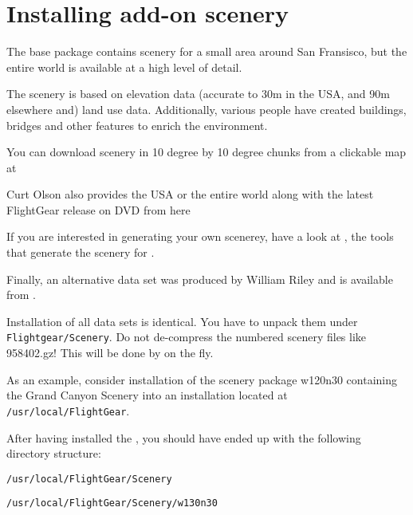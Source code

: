 \section{Installing add-on scenery}

The \FlightGear{} base package contains scenery for a small area around San Fransisco, but the entire world is available at a high level of detail.

The scenery is based on  elevation data (accurate to 30m in the USA, and 90m elsewhere and)  land use data. Additionally, various people have created buildings, bridges and other features to enrich the environment.

You can download scenery in 10 degree by 10 degree chunks from a clickable map at

\medskip
{}
\medskip

Curt Olson also provides the USA or the entire world along with the latest FlightGear release on DVD from here
\medskip
{}
\medskip

If you are interested in generating your own scenerey, have a look at , the tools that generate the scenery for \FlightGear{}.

Finally, an alternative data set was produced by William Riley and is available from
.

Installation of all data sets is identical. You have to unpack them
under \texttt{Flightgear/Scenery}. Do not de-compress the numbered
scenery files like 958402.gz! This will be done by \FlightGear{} on the
fly.

As an example, consider installation of the scenery package w120n30 containing the Grand
Canyon Scenery into an installation located at \texttt{/usr/local/FlightGear}.

After having installed the , you should have ended up with the
following directory structure:
\medskip

\noindent
 \texttt{/usr/local/FlightGear/Scenery}

\noindent
 \texttt{/usr/local/FlightGear/Scenery/w130n30}

